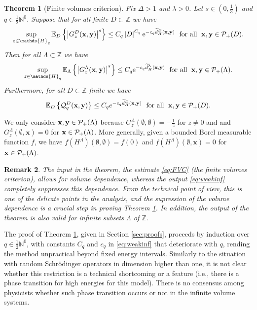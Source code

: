\documentclass[12pt, a4paper,reqno]{amsart}
\numberwithin{equation}{section}
\newtheorem{theorem}{Theorem}[section]
\newtheorem{remark}[theorem]{Remark}
\newcommand\N{\mathbb N}
\newcommand\Z{\mathbb Z}
\newcommand\x{\mathbf{x}}
\newcommand\y{\mathbf{y}}
\newcommand\e{\mathrm{e}}
\newcommand\E{\mathbb E}
\newcommand\cQ{\mathcal{Q}}
\newcommand\cP{\mathcal{P}}
\newcommand\wtilde{\widetilde}
\newcommand\be{\begin{equation}\begin{aligned}}
\newcommand\ee{\end{aligned}\end{equation}}
\newcommand{\abs}[1]{\left\lvert #1 \right\rvert}
\newcommand{\set}[1]{\left\{ #1 \right\}}
\newcommand\La{\Lambda}
\newcommand{\eq}[1]{\eqref{#1}}
\newcommand{\mqtx}[1]{\; \ \text{#1}\; \  }
\begin{document}
 
\begin{theorem}[Finite volumes criterion]\label{cor:weakinf} 
Fix $\Delta >1$ and $\lambda >0$.
  Let  $s\in (0,\frac 13)$ and  $q\in \frac 12 \N^0$.    Suppose that for  all finite $D\subset \Z$  we have
 \be\label{eq:FVC}
\sup_{z\in\mathds{H}_q} \E_D\set{\abs{G^{D}_{z}({\bf x},{\bf y})}^s}\le C_q \abs{D}^{C_q}\e^{-c_q  \wtilde d^D_H ({\bf x},{\bf y})} \mqtx{for all} {\bf x},{\bf y} \in \cP_+(D).
\ee
 Then    for all  $\La\subset\Z$     we have
 \be\label{eq:weakinf} 
\sup_{z\in\mathds{H}_q}\E_\La \set{\abs{G^{\La}_{z} ({\bf x},{\bf y})}^s}\le  C_{q}\e^{-c_{q} \wtilde d_H^\La ({\bf x},{\bf y})} \mqtx{for all}  {\bf x},{\bf y} \in \cP_+(\La).
\ee 
      Furthermore, for all $D\subset \Z$ finite we have
 \be \label{eq:smva+}
\E_{D}\set{\cQ_q^D ({\bf x},{\bf y})}\le  C_q e^{-c_q \wtilde d_{H}^D({\bf x},{\bf y})}  \mqtx{for all}\x,\y\in \cP_{+}(D).
\ee    
\end{theorem}


 We only consider ${\bf x},{\bf y} \in \cP_+(\La)$  because $G_z^\La(\emptyset,\emptyset)=- \tfrac 1z$ for $z\ne 0$ and and  $G_z^\La(\emptyset,\x)=0$ for ${\bf x} \in \cP_+(\La)$.  More generally,    given a  bounded Borel measurable function $f$, we have $f(H^\La)(\emptyset,\emptyset)=f(0)$  and  $f(H^\La)(\emptyset,\x)=0$  for ${\bf x} \in \cP_+(\La)$. 
 
 
 
 
 
 
 
 


















 
\begin{remark}
The input in the theorem,  the estimate \eq{eq:FVC} (the  finite volumes criterion), allows for volume dependence, whereas  the output \eq{eq:weakinf}   
 completely suppresses this dependence. From the technical point of view, this is one of the delicate points in  the analysis,  and the supression of the volume dependence is a crucial step in proving  Theorem \ref{cor:weakinf}.    In addition, the output of the theorem is also valid  for infinite subsets $\La$ of $ \Z$.
\end{remark}
 The proof of Theorem \ref{cor:weakinf}, given in Section \ref{sec:proofs}, proceeds by  induction over $q\in \frac 12\N^0$, with constants $C_q$ and $c_q$ in  \eq{eq:weakinf}  that deteriorate with $q$, rending the method unpractical beyond fixed energy intervals. Similarly to the situation with random Schr\"odinger operators in dimension higher than one, it is not clear whether this restriction is a technical shortcoming or a feature (i.e., there is a phase transition for high energies for this model). There is no consensus among physicists whether such phase transition occurs or not in the infinite volume systems.
\end{document}
